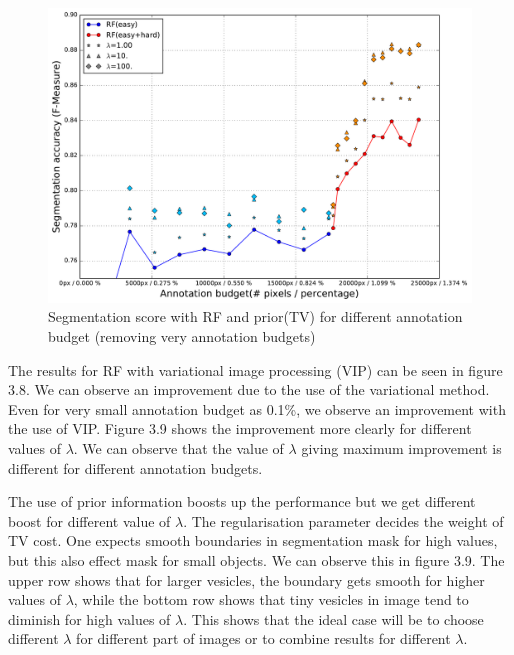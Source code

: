 \begin{figure}[h!] \label{fig:rf_vip}
\centering
 \includegraphics[width=0.75\linewidth]{figures/rf_vip_easy_then_hard.pdf}
\caption{Segmentation score with RF and prior(TV) for different annotation budget (removing very annotation budgets)}
\end{figure}

The results for RF with variational image processing (VIP) can be seen in figure 3.8. We can observe an improvement due to the use of the variational method. Even for very small annotation budget as 0.1\%, we observe an improvement with the use of VIP. Figure 3.9 shows the improvement more clearly for different values of $\lambda$. We can observe that the value of $\lambda$ giving maximum improvement is different for different annotation budgets. 

The use of prior information boosts up the performance but we get different boost for different value of $\lambda$. The regularisation parameter decides the weight of TV cost. One expects smooth boundaries in segmentation mask for high values, but this also effect mask for small objects. We can observe this in figure 3.9. The upper row shows that for larger vesicles, the boundary gets smooth for higher values of $\lambda$, while the bottom row shows that tiny vesicles in image tend to diminish for high values of $\lambda$. This shows that the ideal case will be to choose different $\lambda$ for different part of images or to combine results for different $\lambda$. 

